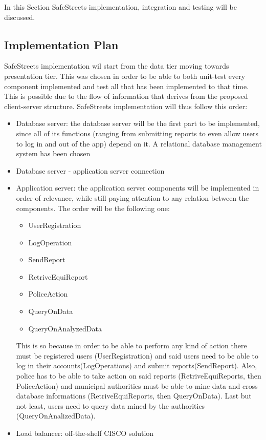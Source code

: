 In this Section SafeStreets implementation, integration and testing will be discussed.
\\

\subsection{Implementation Plan}
SafeStreets implementation wil start from the data tier moving towards presentation tier. This was chosen in order to be able to both unit-test every component implemented and test all that has been implemented to that time. This is possible due to the flow of information that derives from the proposed client-server structure.\newline
SafeStreets implementation will thus follow this order:
\begin{itemize}
	\item Database server: the database server will be the first part to be implemented, since all of its functions (ranging from submitting reports to even allow users to log in and out of the app) depend on it. A relational database management system has been chosen
	\item Database server - application server connection
	\item Application server: the application server components will be implemented in order of relevance, while still paying attention to any relation between the components. The order will be the following one:
	\begin{itemize}
		\item UserRegistration
		\item LogOperation
		\item SendReport
		\item RetriveEquiReport
		\item PoliceAction
		\item QueryOnData
		\item QueryOnAnalyzedData
	\end{itemize}
	This is so because in order to be able to perform any kind of action there must be registered users (UserRegistration) and said users need to be able to log in their accounts(LogOperations) and submit reports(SendReport). Also, police has to be able to take action on said reports (RetriveEquiReports, then PoliceAction)  and municipal authorities must be able to mine data and cross database informations (RetriveEquiReports, then QueryOnData). Last but not least, users need to query data mined by the authorities (QueryOnAnalizedData).
	\item Load balancer: off-the-shelf CISCO solution

\end{itemize}
